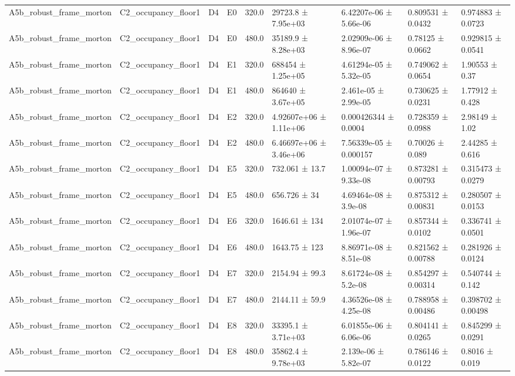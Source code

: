 \begin{table}
\begin{tabular}{lllllllll}
A5b\_robust\_frame\_morton & C2\_occupancy\_floor1 & D4 & E0 & 320.0 & 29723.8 ± 7.95e+03 & 6.42207e-06 ± 5.66e-06 & 0.809531 ± 0.0432 & 0.974883 ± 0.0723 \\
A5b\_robust\_frame\_morton & C2\_occupancy\_floor1 & D4 & E0 & 480.0 & 35189.9 ± 8.28e+03 & 2.02909e-06 ± 8.96e-07 & 0.78125 ± 0.0662 & 0.929815 ± 0.0541 \\
A5b\_robust\_frame\_morton & C2\_occupancy\_floor1 & D4 & E1 & 320.0 & 688454 ± 1.25e+05 & 4.61294e-05 ± 5.32e-05 & 0.749062 ± 0.0654 & 1.90553 ± 0.37 \\
A5b\_robust\_frame\_morton & C2\_occupancy\_floor1 & D4 & E1 & 480.0 & 864640 ± 3.67e+05 & 2.461e-05 ± 2.99e-05 & 0.730625 ± 0.0231 & 1.77912 ± 0.428 \\
A5b\_robust\_frame\_morton & C2\_occupancy\_floor1 & D4 & E2 & 320.0 & 4.92607e+06 ± 1.11e+06 & 0.000426344 ± 0.0004 & 0.728359 ± 0.0988 & 2.98149 ± 1.02 \\
A5b\_robust\_frame\_morton & C2\_occupancy\_floor1 & D4 & E2 & 480.0 & 6.46697e+06 ± 3.46e+06 & 7.56339e-05 ± 0.000157 & 0.70026 ± 0.089 & 2.44285 ± 0.616 \\
A5b\_robust\_frame\_morton & C2\_occupancy\_floor1 & D4 & E5 & 320.0 & 732.061 ± 13.7 & 1.00094e-07 ± 9.33e-08 & 0.873281 ± 0.00793 & 0.315473 ± 0.0279 \\
A5b\_robust\_frame\_morton & C2\_occupancy\_floor1 & D4 & E5 & 480.0 & 656.726 ± 34 & 4.69464e-08 ± 3.9e-08 & 0.875312 ± 0.00831 & 0.280507 ± 0.0153 \\
A5b\_robust\_frame\_morton & C2\_occupancy\_floor1 & D4 & E6 & 320.0 & 1646.61 ± 134 & 2.01074e-07 ± 1.96e-07 & 0.857344 ± 0.0102 & 0.336741 ± 0.0501 \\
A5b\_robust\_frame\_morton & C2\_occupancy\_floor1 & D4 & E6 & 480.0 & 1643.75 ± 123 & 8.86971e-08 ± 8.51e-08 & 0.821562 ± 0.00788 & 0.281926 ± 0.0124 \\
A5b\_robust\_frame\_morton & C2\_occupancy\_floor1 & D4 & E7 & 320.0 & 2154.94 ± 99.3 & 8.61724e-08 ± 5.2e-08 & 0.854297 ± 0.00314 & 0.540744 ± 0.142 \\
A5b\_robust\_frame\_morton & C2\_occupancy\_floor1 & D4 & E7 & 480.0 & 2144.11 ± 59.9 & 4.36526e-08 ± 4.25e-08 & 0.788958 ± 0.00486 & 0.398702 ± 0.00498 \\
A5b\_robust\_frame\_morton & C2\_occupancy\_floor1 & D4 & E8 & 320.0 & 33395.1 ± 3.71e+03 & 6.01855e-06 ± 6.06e-06 & 0.804141 ± 0.0265 & 0.845299 ± 0.0291 \\
A5b\_robust\_frame\_morton & C2\_occupancy\_floor1 & D4 & E8 & 480.0 & 35862.4 ± 9.78e+03 & 2.139e-06 ± 5.82e-07 & 0.786146 ± 0.0122 & 0.8016 ± 0.019 \\

\end{tabular}
\end{table}
